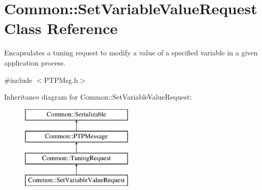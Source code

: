\hypertarget{class_common_1_1_set_variable_value_request}{\section{Common\-:\-:Set\-Variable\-Value\-Request Class Reference}
\label{class_common_1_1_set_variable_value_request}
}


Encapsulates a tuning request to modify a value of a specified variable in a given application process.  




{\ttfamily \#include $<$P\-T\-P\-Msg.\-h$>$}

Inheritance diagram for Common\-:\-:Set\-Variable\-Value\-Request\-:\begin{figure}[H]
\begin{center}
\leavevmode
\includegraphics[height=4.000000cm]{class_common_1_1_set_variable_value_request}
\end{center}
\end{figure}
